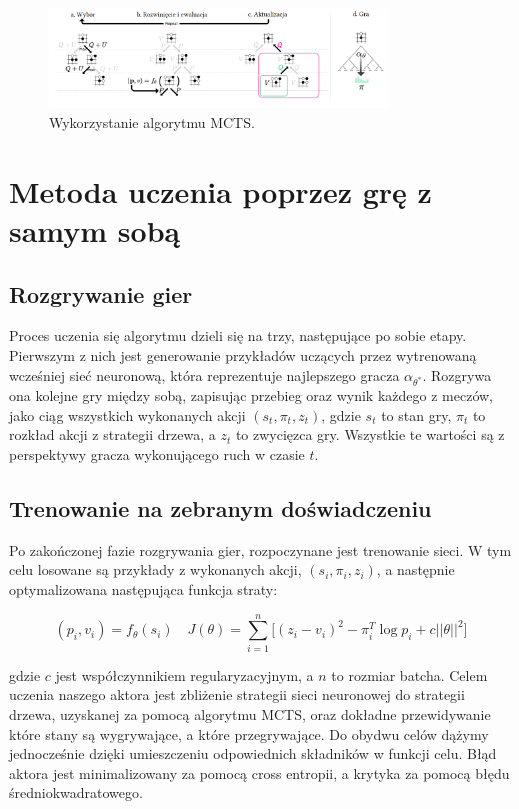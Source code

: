\documentclass[licencjacka]{pracamgr}
\begin{document}
\begin{figure}[ht!]
  \centering
  \includegraphics[width=0.8\textwidth]{alphago-mcts}
  \caption{Wykorzystanie algorytmu MCTS. \cite{alphagozero}}
\end{figure}

\section{Metoda uczenia poprzez grę z samym sobą}

\subsection{Rozgrywanie gier}

Proces uczenia się algorytmu dzieli się na trzy, następujące po sobie etapy. Pierwszym z nich jest generowanie przykładów uczących przez wytrenowaną wcześniej sieć neuronową, która reprezentuje najlepszego gracza $\alpha_{\theta^\ast}$. Rozgrywa ona kolejne gry między sobą, zapisując przebieg oraz wynik każdego z meczów, jako ciąg wszystkich wykonanych akcji $(s_t, \pi_t, z_t)$, gdzie $s_t$ to stan gry, $\pi_t$ to rozkład akcji z strategii drzewa, a $z_t$ to zwycięzca gry. Wszystkie te wartości są z perspektywy gracza wykonującego ruch w czasie $t$.

\subsection{Trenowanie na zebranym doświadczeniu}

Po zakończonej fazie rozgrywania gier, rozpoczynane jest trenowanie sieci. W tym celu losowane są przykłady z wykonanych akcji, $(s_i, \pi_i, z_i)$, a następnie optymalizowana następująca funkcja straty:

$$ (p_i, v_i) = f_\theta(s_i) \quad
J(\theta) = \sum_{i = 1}^n \Big[ (z_i - v_i)^2 - \pi_i^T \log p_i + c \lvert \lvert \theta \rvert \rvert^2 \Big]
$$

gdzie $c$ jest współczynnikiem regularyzacyjnym, a $n$ to rozmiar batcha. Celem uczenia naszego aktora jest zbliżenie strategii sieci neuronowej do strategii drzewa, uzyskanej za pomocą algorytmu MCTS, oraz dokładne przewidywanie które stany są wygrywające, a które przegrywające. Do obydwu celów dążymy jednocześnie dzięki umieszczeniu odpowiednich składników w funkcji celu. Błąd aktora jest minimalizowany za pomocą cross entropii, a krytyka za pomocą błędu średniokwadratowego.
\end{document}
